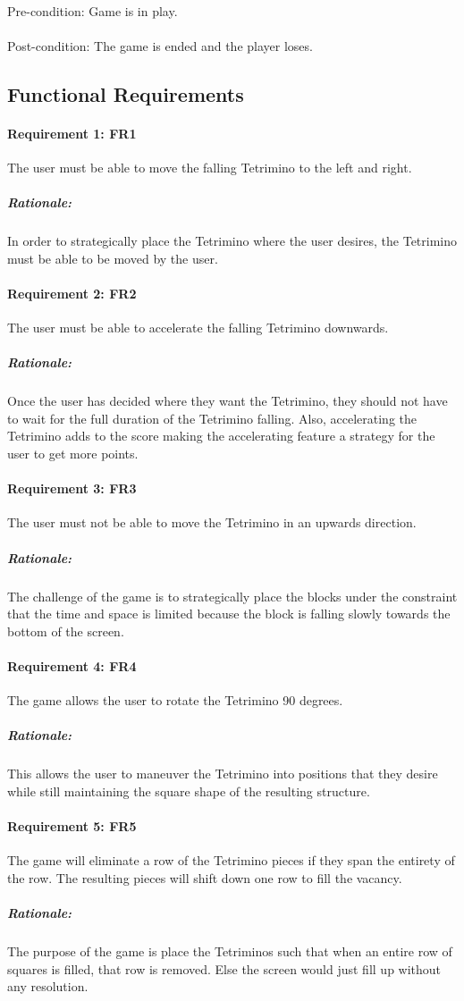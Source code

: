 \documentclass[12pt, titlepage]{article}
\begin{document}
\paragraph{}
Pre-condition: Game is in play.
\paragraph{}
Post-condition: The game is ended and the player loses.

\subsection{Functional Requirements}

\paragraph{Requirement 1: FR1}
The user must be able to move the falling Tetrimino to the left and right.
\subparagraph{Rationale:}
In order to strategically place the Tetrimino where the user desires, the Tetrimino must be able to be moved by the user.
\paragraph{Requirement 2: FR2}
The user must be able to accelerate the falling Tetrimino downwards.
\subparagraph{Rationale:}
Once the user has decided where they want the Tetrimino, they should not have to wait for the full duration of the Tetrimino falling. Also, accelerating the Tetrimino adds to the score making the accelerating feature a strategy for the user to get more points.
\paragraph{Requirement 3: FR3}
The user must not be able to move the Tetrimino in an upwards direction.
\subparagraph{Rationale:}
The challenge of the game is to strategically place the blocks under the constraint that the time and space is limited because the block is falling slowly towards the bottom of the screen.
\paragraph{Requirement 4: FR4}
The game allows the user to rotate the Tetrimino 90 degrees.
\subparagraph{Rationale:}
This allows the user to maneuver the Tetrimino into positions that they desire while still maintaining the square shape of the resulting structure.
\paragraph{Requirement 5: FR5}
The game will eliminate a row of the Tetrimino pieces if they span the entirety of the row. The resulting pieces will shift down one row to fill the vacancy.
\subparagraph{Rationale:}
The purpose of the game is place the Tetriminos such that when an entire row of squares is filled, that row is removed. Else the screen would just fill up without any resolution.
\end{document}
